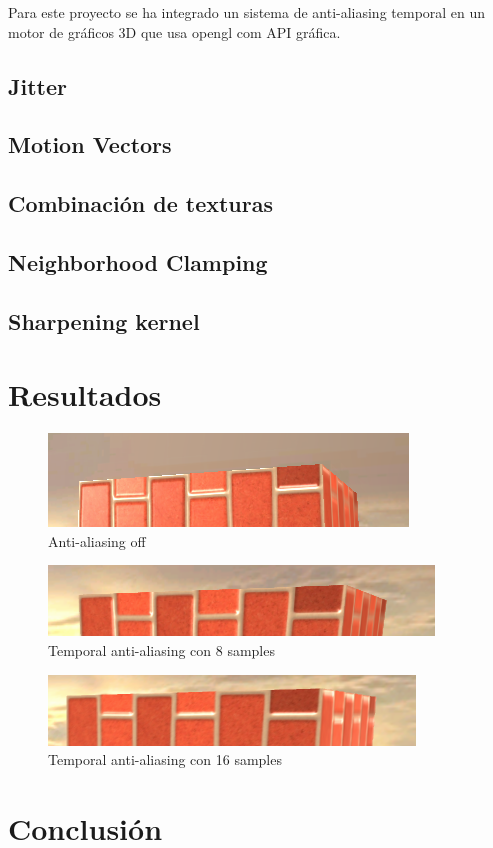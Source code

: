 \documentclass[withindex, glossary]{cam-thesis}
\begin{document}
Para este proyecto se ha integrado un sistema de anti-aliasing temporal en un motor de gráficos 3D que usa \Gls{opengl} com API gráfica.

\section{Jitter}

\section{Motion Vectors}

\section{Combinación de texturas}

\section{Neighborhood Clamping}

\section{Sharpening kernel}

\chapter{Resultados}

\begin{figure}
    \includegraphics[width=\linewidth]{figures/taaoff.png}
    \caption{Anti-aliasing off}
\end{figure}

\begin{figure}
    \includegraphics[width=\linewidth]{figures/taa8.png}
    \caption{Temporal anti-aliasing con 8 samples}
\end{figure}

\begin{figure}
    \includegraphics[width=\linewidth]{figures/taa16.png}
    \caption{Temporal anti-aliasing con 16 samples}
\end{figure}

\chapter{Conclusión}

\nocite{*}
\printbibliography{}

\listoffigures
\listoftables

\printthesisindex{}
\end{document}
